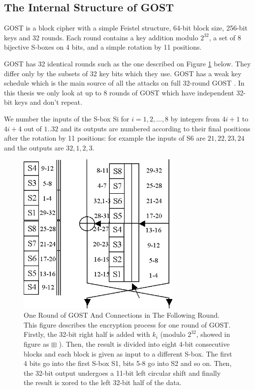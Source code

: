 \subsection{The Internal Structure of GOST}
GOST is a block cipher with a simple Feistel structure,
64-bit block size, 256-bit keys and 32 rounds.
Each round contains a key addition modulo $2^{32}$,
a set of 8 bijective S-boxes on 4 bits,
and a simple rotation by 11 positions.

GOST has 32 identical rounds such as the one described on Figure \ref{GostRoundAndConnections} below.
They differ only by the subsets of 32 key bits which they use. GOST has a weak key schedule which is the main source of all the attacks on full 32-round GOST \cite{gostreport,gostac,JapaneseGOSTMITMFSE2011,gostdcpp1,gostdc0,gostdc1,gostdc2,DunkelmanImprovedGOST8R}.  
In this thesis we only look at up to 8 rounds of GOST which have independent 32-bit keys and don't repeat.

We number the inputs of the S-box Si for $i=1,2,\ldots,8$ by integers from $4i+1$ to $4i+4$ out of $1..32$ and its outputs are numbered according to their final positions after the rotation by 11 positions: for example the inputs of S6 are $21,22,23,24$ and the outputs are $32,1,2,3$.


\begin{figure}[h] 
	\centering
	\includegraphics[width=80mm]{./pics/gostfeist2.jpg}
	
	\caption[One Round of GOST And Connections in The Following Round] {One Round of GOST And Connections in The Following Round. This figure describes the encryption process for one round of GOST. Firstly, the 32-bit right half is added with $k_{i}$ (modulo $2^{32}$, showed in figure as  $\boxplus$ ). Then, the result is divided into eight 4-bit consecutive blocks and each block is given as input to a different S-box. The first 4 bits go into the first S-box S1, bits 5-8 go into S2 and so on. Then, the 32-bit output undergoes a 11-bit left circular shift and finally the result is xored to the left 32-bit half of the data.}
	\label{GostRoundAndConnections}
\end{figure}

